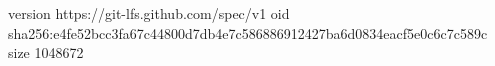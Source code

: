 version https://git-lfs.github.com/spec/v1
oid sha256:e4fe52bcc3fa67c44800d7db4e7c586886912427ba6d0834eacf5e0c6c7c589c
size 1048672
